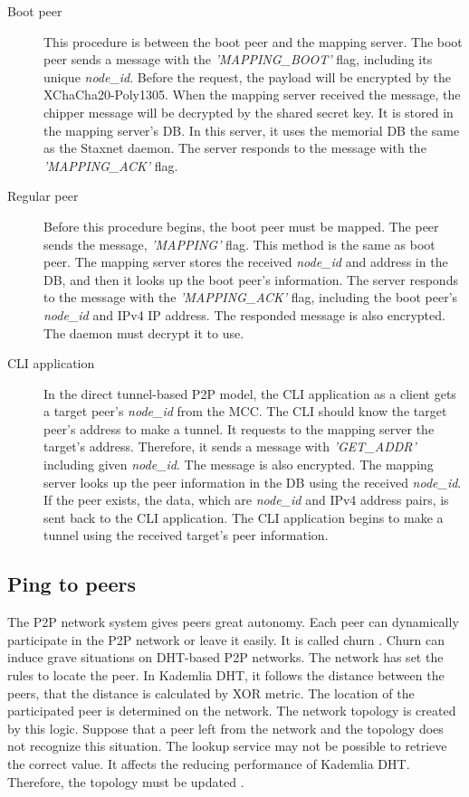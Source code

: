 \begin{description}
	\item[Boot peer] This procedure is between the boot peer and the mapping server. The boot peer sends a message with the \textit{'MAPPING\_BOOT' }flag, including its unique \textit{node\_id}. Before the request, the payload will be encrypted by the XChaCha20-Poly1305. When the mapping server received the message, the chipper message will be decrypted by the shared secret key. It is stored in the mapping server's DB. In this server, it uses the memorial DB the same as the Staxnet daemon. The server responds to the message with the \textit{'MAPPING\_ACK'} flag.

	\item[Regular peer] Before this procedure begins, the boot peer must be mapped. The peer sends the message, \textit{'MAPPING'} flag. This method is the same as boot peer. The mapping server stores the received \textit{node\_id} and address in the DB, and then it looks up the boot peer's information. The server responds to the message with the \textit{'MAPPING\_ACK'} flag, including the boot peer's \textit{node\_id} and IPv4 IP address. The responded message is also encrypted. The daemon must decrypt it to use.

	\item[CLI application] In the direct tunnel-based P2P model, the CLI application as a client gets a target peer's \textit{node\_id} from the MCC. The CLI should know the target peer's address to make a tunnel. It requests to the mapping server the target's address. Therefore, it sends a message with \textit{'GET\_ADDR'} including given \textit{node\_id}. The message is also encrypted. The mapping server looks up the peer information in the DB using the received \textit{node\_id}. If the peer exists, the data, which are \textit{node\_id} and IPv4 address pairs, is sent back to the CLI application. The CLI application begins to make a tunnel using the received target's peer information.
\end{description}

\subsection{Ping to peers}

The P2P network system gives peers great autonomy. Each peer can dynamically participate in the P2P network or leave it easily. It is called churn \cite{medrano2013effect}. Churn can induce grave situations on DHT-based P2P networks. The network has set the rules to locate the peer. In Kademlia DHT, it follows the distance between the peers, that the distance is calculated by XOR metric. The location of the participated peer is determined on the network. The network topology is created by this logic. Suppose that a peer left from the network and the topology does not recognize this situation. The lookup service may not be possible to retrieve the correct value. It affects the reducing performance of Kademlia DHT. Therefore, the topology must be updated \cite{bustamante2004friendships}\cite{stutzbach2006understanding}\cite{stutzbach2006understanding}. 

